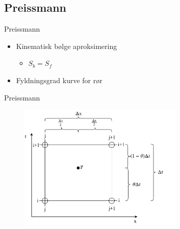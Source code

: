 \subsection{Preissmann}

\begin{frame}{Preissmann}{}
\vfill\vfill\centering
\begin{itemize}
	\vspace{2mm}
	\item Kinematisk bølge aproksimering
	\begin{itemize}
		\item $S_b = S_f$
	\end{itemize}
	\vspace{3mm}
	\item Fyldningsgrad kurve for rør
\end{itemize}
\vfill\vfill		
\end{frame}

\begin{frame}{Preissmann}{}
\vfill\vfill\centering
		\begin{figure}[H]
			\centering
			\includegraphics[width=0.7\textwidth]{Sections/pictures/preissmann_scheme.pdf}
		\end{figure}
\vfill\vfill		
\end{frame}


